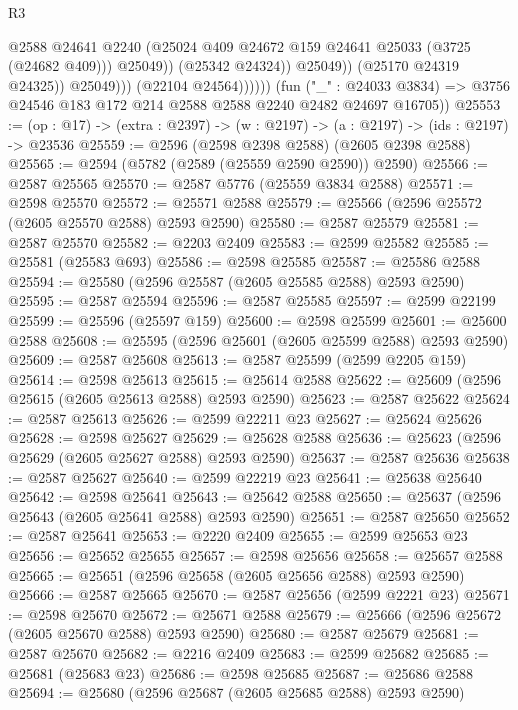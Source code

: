 \begin{lexlean}{R3}
\begin{coremodule}
                                  @2588
                                  @24641
                                  @2240
                                  (@25024 @409 @24672 @159 @24641 @25033 (@3725 (@24682 @409)))
                                  @25049))
                              (@25342 @24324))
                            @25049))
                        (@25170 @24319 @24325))
                      @25049)))
                (@22104 @24564))))))
      (fun ("_" : @24033 @3834) =>
      @3756 @24546 @183 @172 @214 @2588 @2588 @2240 @2482 @24697 @16705))
@25553 := (op : @17) -> (extra : @2397) -> (w : @2197) -> (a : @2197) -> (ids : @2197) -> @23536
@25559 := @2596 (@2598 @2398 @2588) (@2605 @2398 @2588)
@25565 := @2594 (@5782 (@2589 (@25559 @2590 @2590)) @2590)
@25566 := @2587 @25565
@25570 := @2587 @5776 (@25559 @3834 @2588)
@25571 := @2598 @25570
@25572 := @25571 @2588
@25579 := @25566 (@2596 @25572 (@2605 @25570 @2588) @2593 @2590)
@25580 := @2587 @25579
@25581 := @2587 @25570
@25582 := @2203 @2409
@25583 := @2599 @25582
@25585 := @25581 (@25583 @693)
@25586 := @2598 @25585
@25587 := @25586 @2588
@25594 := @25580 (@2596 @25587 (@2605 @25585 @2588) @2593 @2590)
@25595 := @2587 @25594
@25596 := @2587 @25585
@25597 := @2599 @22199
@25599 := @25596 (@25597 @159)
@25600 := @2598 @25599
@25601 := @25600 @2588
@25608 := @25595 (@2596 @25601 (@2605 @25599 @2588) @2593 @2590)
@25609 := @2587 @25608
@25613 := @2587 @25599 (@2599 @2205 @159)
@25614 := @2598 @25613
@25615 := @25614 @2588
@25622 := @25609 (@2596 @25615 (@2605 @25613 @2588) @2593 @2590)
@25623 := @2587 @25622
@25624 := @2587 @25613
@25626 := @2599 @22211 @23
@25627 := @25624 @25626
@25628 := @2598 @25627
@25629 := @25628 @2588
@25636 := @25623 (@2596 @25629 (@2605 @25627 @2588) @2593 @2590)
@25637 := @2587 @25636
@25638 := @2587 @25627
@25640 := @2599 @22219 @23
@25641 := @25638 @25640
@25642 := @2598 @25641
@25643 := @25642 @2588
@25650 := @25637 (@2596 @25643 (@2605 @25641 @2588) @2593 @2590)
@25651 := @2587 @25650
@25652 := @2587 @25641
@25653 := @2220 @2409
@25655 := @2599 @25653 @23
@25656 := @25652 @25655
@25657 := @2598 @25656
@25658 := @25657 @2588
@25665 := @25651 (@2596 @25658 (@2605 @25656 @2588) @2593 @2590)
@25666 := @2587 @25665
@25670 := @2587 @25656 (@2599 @2221 @23)
@25671 := @2598 @25670
@25672 := @25671 @2588
@25679 := @25666 (@2596 @25672 (@2605 @25670 @2588) @2593 @2590)
@25680 := @2587 @25679
@25681 := @2587 @25670
@25682 := @2216 @2409
@25683 := @2599 @25682
@25685 := @25681 (@25683 @23)
@25686 := @2598 @25685
@25687 := @25686 @2588
@25694 := @25680 (@2596 @25687 (@2605 @25685 @2588) @2593 @2590)

\end{coremodule}
\end{lexlean}
